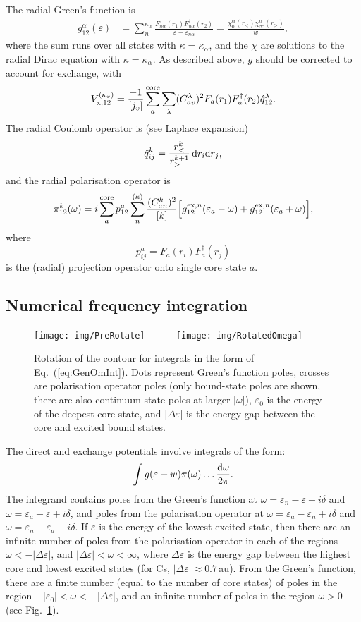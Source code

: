 \documentclass[10pt,twocolumn,a4paper]{article}%
\newcommand{\be}{\begin{equation}}
\newcommand{\ee}{\end{equation}}
\def\d{\ensuremath{{\rm d}}}
\def\en{\ensuremath{\varepsilon}}
\renewcommand{\a}{\ensuremath{\alpha}}
\renewcommand{\k}{\ensuremath{\kappa}}
\newcommand{\w}{\ensuremath{\omega}}
\begin{document}
The radial Green's function is
\begin{align}\label{eq:RadialGreen}
g^\a_{12}(\en) &= \sum_n^{\k_\a} \frac{F_{n\a}(r_1)F^\dag_{n\a}(r_2)}{\en-\en_{n\a}}
= \frac{\chi_0^\a(r_<)\chi_\infty^\a(r_>)}{w},
\end{align}
where the sum runs over all states with $\k=\k_\a$, and the $\chi$ are solutions to the radial Dirac equation with $\k=\k_\a$.
As described above, $g$ should be corrected to account for exchange, with
\be\label{eq:RadialVx}
V_{\rm x,12}^{(\k_v)} = \frac{-1}{[j_v]}\sum_a^{\rm core}\sum_\lambda (C^\lambda_{av})^2F_a(r_1)F_a^\dag(r_2)\hat q^\lambda_{12}.
\ee
The radial Coulomb operator is (see Laplace expansion)
\be\label{eq:RadialQ}
\hat q^k_{ij} = \frac{r_<^k}{r_>^{k+1}} \, \d r_i\d r_j,
\ee
and the radial polarisation operator is
\begin{multline}\label{eq:RadialPolarisation}
\pi_{12}^{k}(\w) = i\sum_{a}^{\rm core}p^a_{12}\sum_{n}^{(\kappa)} \frac{(C^k_{an})^2}{[k]}
\Big[g_{12}^{{\rm ex},n}(\en_{a}-\w)
+g_{12}^{{\rm ex},n}(\en_{a}+\w)
\Big],
\end{multline}
where 
\[
p^a_{ij} = F_a(r_i)F^\dag_a(r_j)
\]
is the (radial) projection operator onto single core state $a$.



\subsection{Numerical frequency integration}


\begin{figure}%
\centering%
\texttt{[image: img/PreRotate]}~~
\raisebox{14\height}{${\to}$}~~~
\texttt{[image: img/RotatedOmega]}%
\caption{\small Rotation of the contour for integrals in the form of Eq.~(\ref{eq:GenOmInt}).
Dots represent Green's function poles, crosses are polarisation operator poles (only bound-state poles are shown, there are also continuum-state poles at larger $|\w|$),
$\en_0$ is the energy of the deepest core state, and $|\Delta\en|$ is the energy gap between the core and excited bound states.
\label{fig:contourRotate}}
\end{figure}


The direct and exchange potentials involve integrals of the form:
\be\label{eq:GenOmInt}
\int g(\en+w)\pi(\w)\ldots \frac{\d\w}{2\pi}.
\ee
The integrand contains poles from the Green's function at 
$\w=\en_n-\en-i\delta$ and $\w=\en_a-\en+i\delta$,
and poles from the polarisation operator at 
$\w=\en_a-\en_n+i\delta$ and $\w=\en_n-\en_a-i\delta$.
If $\en$ is the energy of the lowest excited state, then
there are an infinite number of poles from the polarisation operator in each of the regions $\w<-|\Delta\en|$, and $|\Delta\en|<\w<\infty$,
where $\Delta\en$ is the energy gap between the highest core and lowest excited states (for Cs, $|\Delta\en|\approx0.7$\,au).
From the Green's function, there are a finite number (equal to the number of core states) of poles in the region
$-|\en_0|<\w<-|\Delta\en|$, and an infinite number of poles in the region $\w>0$ (see Fig.~\ref{fig:contourRotate}).
\end{document}
